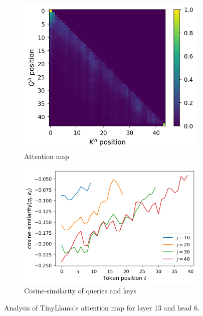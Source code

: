 \begin{figure}[!ht]
\centering
\begin{subfigure}[b]{0.45\columnwidth}
     \includegraphics[width=\linewidth]{sources/part_1/anisotropy/imgs/qk_position_l12h5.png}
     \caption{Attention map}
     \label{fig:amap_l12h5}
\end{subfigure}
\hfill
\begin{subfigure}[b]{0.45\columnwidth}
     \includegraphics[width=\linewidth]{sources/part_1/anisotropy/imgs/cosine_q_khat_l12h5.png}
     \caption{Cosine-similarity of queries and keys}
     \label{fig:cossim_l12h5}
\end{subfigure}
\caption{Analysis of TinyLlama's attention map for layer 13 and head 6.}
\label{fig:attn_maps_l12h5}
\end{figure}

